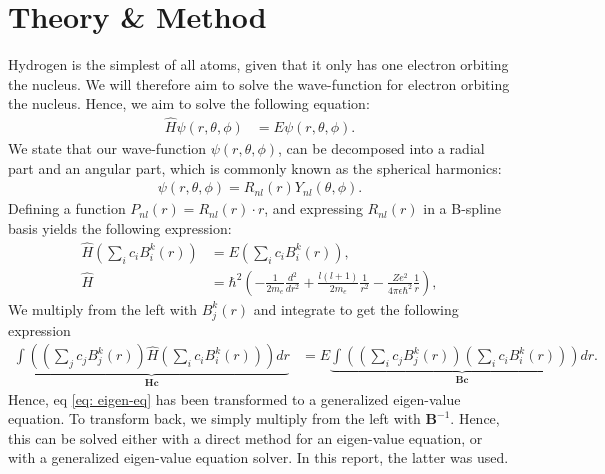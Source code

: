 \documentclass[a4paper]{article}
\begin{document}
\section{Theory \& Method}
Hydrogen is the simplest of all atoms, given that it only has one electron orbiting the nucleus.
We will therefore aim to solve the wave-function for electron orbiting the nucleus. Hence, we aim to solve the following equation:
\begin{align}
    \hat{H}\psi(r, \theta, \phi) &= E\psi(r, \theta, \phi).\label{eq: eigen-eq}
\end{align}We state that our wave-function $\psi(r, \theta, \phi)$, can be decomposed into a radial part and an angular part, which is commonly known as the spherical harmonics:
\begin{align*}
    \psi(r, \theta, \phi) = R_{nl}(r)Y_{nl}(\theta, \phi).
\end{align*}Defining a function $P_{nl}(r) = R_{nl}(r)\cdot r$, and expressing $R_{nl}(r)$ in a B-spline basis yields the following expression:
\begin{align}
    \hat{H}\left(\sum_i c_i B_i^k(r)\right) &= E\left(\sum_i c_i B_i^k(r)\right),\\
    \hat{H} &= \hbar^2\left(-\frac{1}{2m_e}\frac{d^2}{dr^2} + \frac{l(l + 1)}{2m_e}\frac{1}{r^2} - \frac{Ze^2}{4\pi\epsilon\hbar^2}\frac{1}{r}\right),\label{eq: hamiltonian}
\end{align}
We multiply from the left with $B_j^k(r)$ and integrate to get the following expression
\begin{align}
    \underbrace{\int\left(\left(\sum_j c_j B_j^k(r)\right)\hat{H}\left(\sum_i c_i B_i^k(r)\right)\right)dr}_{\mathbf{H}\mathbf{c}} &= E\underbrace{\int\left(\left(\sum_i c_j B_j^k(r)\right)\left(\sum_i c_i B_i^k(r)\right)\right)dr}_{\mathbf{B}\mathbf{c}}.\label{eq: gen eq}
\end{align}Hence, eq \eqref{eq: eigen-eq} has been transformed to a generalized eigen-value equation.
To transform back, we simply multiply from the left with $\mathbf{B}^{-1}$.
Hence, this can be solved either with a direct method for an eigen-value equation, or with a generalized eigen-value equation solver. In this report, the latter was used.
\end{document}
